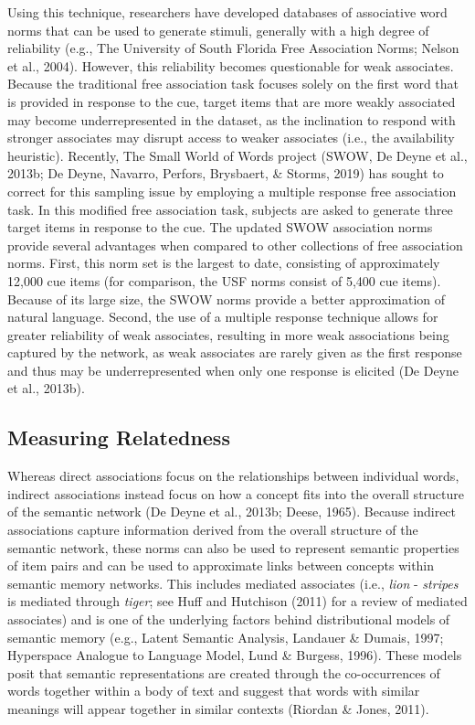 \documentclass[english,,man]{apa6}
\begin{document}
Using this technique, researchers have developed databases of associative word norms that can be used to generate stimuli, generally with a high degree of reliability (e.g., The University of South Florida Free Association Norms; Nelson et al., 2004). However, this reliability becomes questionable for weak associates. Because the traditional free association task focuses solely on the first word that is provided in response to the cue, target items that are more weakly associated may become underrepresented in the dataset, as the inclination to respond with stronger associates may disrupt access to weaker associates (i.e., the availability heuristic). Recently, The Small World of Words project (SWOW, De Deyne et al., 2013b; De Deyne, Navarro, Perfors, Brysbaert, \& Storms, 2019) has sought to correct for this sampling issue by employing a multiple response free association task. In this modified free association task, subjects are asked to generate three target items in response to the cue. The updated SWOW association norms provide several advantages when compared to other collections of free association norms. First, this norm set is the largest to date, consisting of approximately 12,000 cue items (for comparison, the USF norms consist of 5,400 cue items). Because of its large size, the SWOW norms provide a better approximation of natural language. Second, the use of a multiple response technique allows for greater reliability of weak associates, resulting in more weak associations being captured by the network, as weak associates are rarely given as the first response and thus may be underrepresented when only one response is elicited (De Deyne et al., 2013b).

\hypertarget{measuring-relatedness}{%
\subsection{Measuring Relatedness}\label{measuring-relatedness}}

Whereas direct associations focus on the relationships between individual words, indirect associations instead focus on how a concept fits into the overall structure of the semantic network (De Deyne et al., 2013b; Deese, 1965). Because indirect associations capture information derived from the overall structure of the semantic network, these norms can also be used to represent semantic properties of item pairs and can be used to approximate links between concepts within semantic memory networks. This includes mediated associates (i.e., \emph{lion} - \emph{stripes} is mediated through \emph{tiger}; see Huff and Hutchison (2011) for a review of mediated associates) and is one of the underlying factors behind distributional models of semantic memory (e.g., Latent Semantic Analysis, Landauer \& Dumais, 1997; Hyperspace Analogue to Language Model, Lund \& Burgess, 1996). These models posit that semantic representations are created through the co-occurrences of words together within a body of text and suggest that words with similar meanings will appear together in similar contexts (Riordan \& Jones, 2011).
\end{document}

